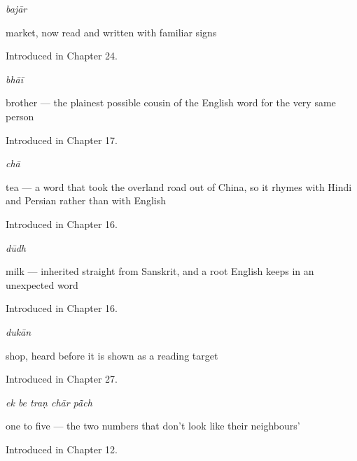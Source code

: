 \noindent\begin{minipage}[t]{\linewidth}
\raggedright
\textbf{}\enspace\emph{bajār}\par
\small market, now read and written with familiar signs\par
\footnotesize Introduced in Chapter 24.
\end{minipage}\par\medskip

\noindent\begin{minipage}[t]{\linewidth}
\raggedright
\textbf{}\enspace\emph{bhāī}\par
\small brother — the plainest possible cousin of the English word for the very same person\par
\footnotesize Introduced in Chapter 17.
\end{minipage}\par\medskip

\noindent\begin{minipage}[t]{\linewidth}
\raggedright
\textbf{}\enspace\emph{chā}\par
\small tea — a word that took the overland road out of China, so it rhymes with Hindi and Persian rather than with English\par
\footnotesize Introduced in Chapter 16.
\end{minipage}\par\medskip

\noindent\begin{minipage}[t]{\linewidth}
\raggedright
\textbf{}\enspace\emph{dūdh}\par
\small milk — inherited straight from Sanskrit, and a root English keeps in an unexpected word\par
\footnotesize Introduced in Chapter 16.
\end{minipage}\par\medskip

\noindent\begin{minipage}[t]{\linewidth}
\raggedright
\textbf{}\enspace\emph{dukān}\par
\small shop, heard before it is shown as a reading target\par
\footnotesize Introduced in Chapter 27.
\end{minipage}\par\medskip

\noindent\begin{minipage}[t]{\linewidth}
\raggedright
\textbf{    }\enspace\emph{ek be traṇ chār pā̃ch}\par
\small one to five — the two numbers that don't look like their neighbours'\par
\footnotesize Introduced in Chapter 12.
\end{minipage}\par\medskip

